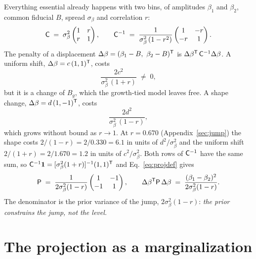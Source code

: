 Everything essential already happens with two bins, of amplitudes
$\beta_1$ and $\beta_2$, common fiducial $B$, spread $\sigma_\beta$ and
correlation $r$:
\begin{equation}
  \mathsf{C} \;=\; \sigma_\beta^2
  \begin{pmatrix} 1 & r \\ r & 1 \end{pmatrix},
  \qquad
  \mathsf{C}^{-1} \;=\; \frac{1}{\sigma_\beta^2\,(1 - r^2)}
  \begin{pmatrix} 1 & -r \\ -r & 1 \end{pmatrix} .
  \label{eq:twobinC}
\end{equation}
The penalty of a displacement
$\Delta\beta = (\beta_1 - B,\ \beta_2 - B)^{\mathsf{T}}$ is
$\Delta\beta^{\mathsf{T}}\, \mathsf{C}^{-1} \Delta\beta$.  A uniform shift,
$\Delta\beta = c\,(1, 1)^{\mathsf{T}}$, costs
\begin{equation}
  \frac{2 c^2}{\sigma_\beta^2\,(1 + r)} \;\neq\; 0 ,
  \label{eq:shiftpenalty}
\end{equation}
but it is a change of $B_g$, which the growth-tied model leaves free.
A shape change, $\Delta\beta = d\,(1, -1)^{\mathsf{T}}$, costs
\begin{equation}
  \frac{2 d^2}{\sigma_\beta^2\,(1 - r)} ,
  \label{eq:shapepenalty}
\end{equation}
which grows without bound as $r \to 1$.  At $r = 0.670$
(Appendix~\ref{sec:jump}) the shape costs
$2/(1 - r) = 2/0.330 = 6.1$ in units of $d^2/\sigma_\beta^2$ and the
uniform shift $2/(1 + r) = 2/1.670 = 1.2$ in units of
$c^2/\sigma_\beta^2$.  Both rows of $\mathsf{C}^{-1}$
have the same sum, so $\mathsf{C}^{-1}\mathbf{1} = [\sigma_\beta^2 (1+r)]^{-1}
(1,1)^{\mathsf{T}}$ and Eq.~\eqref{eq:projdef} gives
\begin{equation}
  \mathsf{P} \;=\;
  \frac{1}{2 \sigma_\beta^2 (1 - r)}
  \begin{pmatrix} 1 & -1 \\ -1 & 1 \end{pmatrix},
  \qquad
  \Delta\beta^{\mathsf{T}} \mathsf{P}\, \Delta\beta
  \;=\;
  \frac{(\beta_1 - \beta_2)^2}{2 \sigma_\beta^2 (1 - r)} .
  \label{eq:twobinP}
\end{equation}
The denominator is the prior variance of the jump,
$2\sigma_\beta^2(1 - r)$: \emph{the prior constrains the jump, not the
level.}

\section{The projection as a marginalization}
\label{sec:threeviews}

